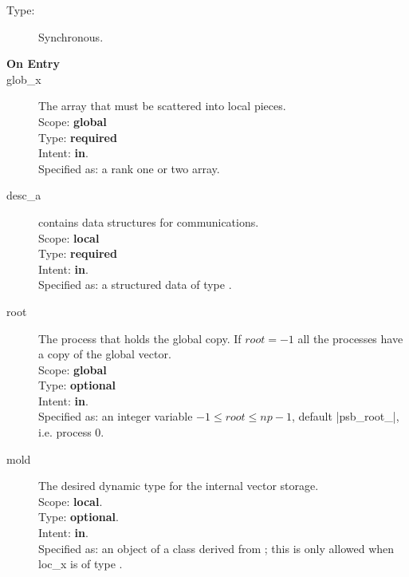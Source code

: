 \begin{description}
\item[Type:] Synchronous.
\item[\bf On Entry]
\item[glob\_x] The array that must be scattered into local pieces.\\
Scope: {\bf global} \\
Type: {\bf required}\\
Intent: {\bf in}.\\
Specified as: a rank one or two array.
\item[desc\_a] contains data structures for communications.\\
Scope: {\bf local} \\
Type: {\bf required}\\
Intent: {\bf in}.\\
Specified as: a structured data of type \descdata.
\item[root]  The process that holds the global copy. If $root=-1$ all
  the processes have a copy of the global vector.\\
Scope: {\bf global} \\
Type: {\bf optional}\\
Intent: {\bf in}.\\
Specified as: an integer variable $-1\le root\le np-1$, default
\fortinline|psb_root_|, i.e. process 0. 
\item[mold] The desired dynamic type for the internal vector storage.\\
Scope: {\bf local}.\\
Type: {\bf optional}.\\
Intent: {\bf in}.\\
Specified as: an object of a class derived from \vbasedata; this is
only allowed when loc\_x is of type \vdata.

\end{description}
